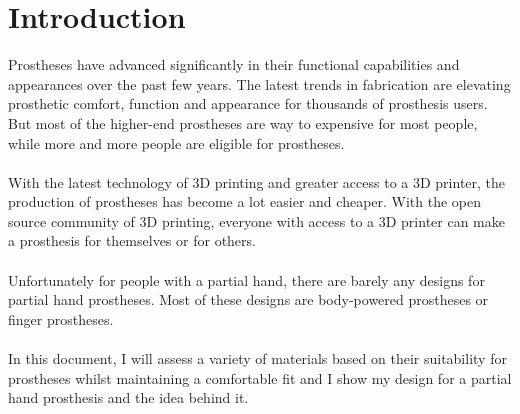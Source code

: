 \documentclass[11pt, a4paper]{article}
\begin{document}
\section{Introduction}
Prostheses have advanced significantly in their functional capabilities and appearances over the past few years.
The latest trends in fabrication are elevating prosthetic comfort, function and appearance for thousands of prosthesis users.
But most of the higher-end prostheses are way to expensive for most people, while more and more people are eligible for prostheses.
\\ \\
With the latest technology of 3D printing and greater access to a 3D printer, the production of prostheses has become a lot easier and cheaper.
With the open source community of 3D printing, everyone with access to a 3D printer can make a prosthesis for themselves or for others.
\\ \\
Unfortunately for people with a partial hand, there are barely any designs for partial hand prostheses.
Most of these designs are body-powered prostheses or finger prostheses.
\\ \\
In this document, I will assess a variety of materials based on their suitability for prostheses whilst maintaining a comfortable fit and I show my design for a partial hand prosthesis and the idea behind it.
\end{document}
